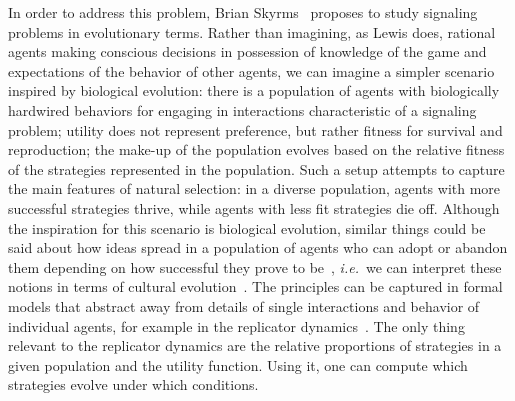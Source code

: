 \documentclass[a4paper]{article}
\begin{document}
In order to address this problem, Brian Skyrms~\parencite*{skyrms_evolution_1996} proposes to study signaling problems in evolutionary terms.
Rather than imagining, as Lewis does, rational agents making conscious decisions in possession of knowledge of the game and expectations of the behavior of other agents, we can imagine a simpler scenario inspired by biological evolution: there is a population of agents with biologically hardwired behaviors for engaging in interactions characteristic of a signaling problem; utility does not represent preference, but rather fitness for survival and reproduction; the make-up of the population evolves based on the relative fitness of the strategies represented in the population.
Such a setup attempts to capture the main features of natural selection: in a diverse population, agents with more successful strategies thrive, while agents with less fit strategies die off.
Although the inspiration for this scenario is biological evolution, similar things could be said about how ideas spread in a population of agents who can adopt or abandon them depending on how successful they prove to be~\parencite[\emph{e.g.}][]{BenzJager2006:Game-Theory-and,Pagel2009:Human-Language-,ThompsonKirby2016:Culture-Shapes-}, \emph{i.e.}~we can interpret these notions in terms of cultural evolution~\parencite{dawkins_selfish_1978,boyd_culture_1985}.
The principles can be captured in formal models that abstract away from details of single interactions and behavior of individual agents, for example in the replicator dynamics~\parencite{TaylorJonker1978:Evolutionary-St}.
The only thing relevant to the replicator dynamics are the relative proportions of strategies in a given population and the utility function.
Using it, one can compute which strategies evolve under which conditions.
\end{document}

